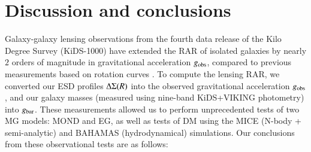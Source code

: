 \documentclass{aa}
\renewcommand{\Upsigma}{{\rm \Sigma}}
\renewcommand{\Updelta}{{\rm \Delta}}
\newcommand{\un}[1]{_{\rm #1}}
\begin{document}
\section{Discussion and conclusions}
\label{sec:Discussion_Conclusion}

Galaxy-galaxy lensing observations from the fourth data release of the Kilo Degree Survey (KiDS-1000) have extended the RAR of isolated galaxies by nearly $2$ orders of magnitude in gravitational acceleration $g\un{obs}$, compared to previous measurements based on rotation curves \cite[most notably][M16]{mcgaugh2016}. To compute the lensing RAR, we converted our ESD profiles $\Updelta\Upsigma(R)$ into the observed gravitational acceleration $g\un{obs}$, and our galaxy masses (measured using nine-band KiDS+VIKING photometry) into $g\un{bar}$. These measurements allowed us to perform unprecedented tests of two MG models: MOND and EG, as well as tests of DM using the MICE (N-body + semi-analytic) and BAHAMAS (hydrodynamical) simulations. Our conclusions from these observational tests are as follows:
\end{document}
